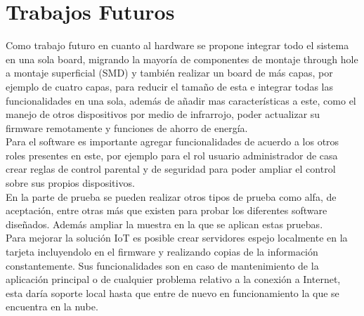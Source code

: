 \chapter{Trabajos Futuros}

Como trabajo futuro en cuanto al hardware se propone integrar todo el sistema en una sola board, migrando la mayoría de componentes de montaje through hole a montaje superficial (SMD) y también realizar un board de más capas, por ejemplo de cuatro capas, para reducir el tamaño de esta e integrar todas las funcionalidades en una sola, además de añadir mas características a este, como el manejo de otros dispositivos por medio de infrarrojo, poder actualizar su firmware remotamente y funciones de ahorro de energía.\\

Para el software es importante agregar funcionalidades de acuerdo a los otros roles presentes en este, por ejemplo para el rol usuario administrador de casa crear reglas de control parental y de seguridad para poder ampliar el control sobre sus propios dispositivos.\\

En la parte de prueba se pueden realizar otros tipos de prueba como alfa, de aceptación, entre otras más que existen para probar los diferentes software diseñados. Además ampliar la muestra en la que se aplican estas pruebas.\\

Para mejorar la solución IoT es posible crear servidores espejo localmente en la tarjeta incluyendolo en el firmware y realizando copias de la información constantemente. Sus funcionalidades son en caso de mantenimiento de la aplicación principal o de cualquier problema relativo a la conexión a Internet, esta daría soporte local hasta que entre de nuevo en funcionamiento la que se encuentra en la nube.\\
